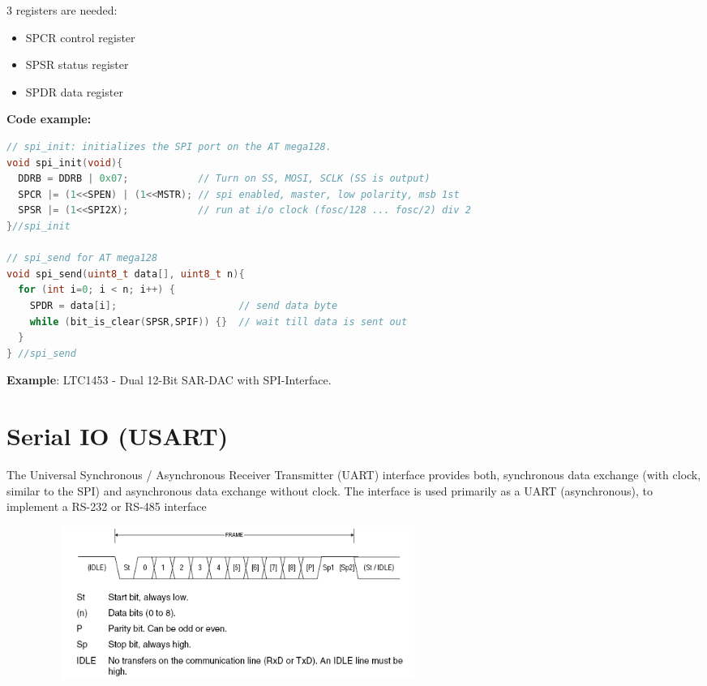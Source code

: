 3 registers are needed:

\begin{multicols}{2}
	\begin{itemize}
	\item  SPCR  control register
	\item  SPSR  status register
	\end{itemize}
	\vfill\null
	\columnbreak
	\begin{itemize}
		\item  SPDR  data register
	\end{itemize}
\end{multicols}
\textbf{Code example:}

\begin{lstlisting}[style=mystyle, language=c]
// spi_init: initializes the SPI port on the AT mega128. 
void spi_init(void){
  DDRB = DDRB | 0x07;            // Turn on SS, MOSI, SCLK (SS is output)
  SPCR |= (1<<SPEN) | (1<<MSTR); // spi enabled, master, low polarity, msb 1st
  SPSR |= (1<<SPI2X);            // run at i/o clock (fosc/128 ... fosc/2) div 2
}//spi_init

// spi_send for AT mega128 
void spi_send(uint8_t data[], uint8_t n){
  for (int i=0; i < n; i++) {
    SPDR = data[i];                     // send data byte
    while (bit_is_clear(SPSR,SPIF)) {}  // wait till data is sent out
  }
} //spi_send
\end{lstlisting}

\textbf{Example}: LTC1453 - Dual 12-Bit SAR-DAC with SPI-Interface.

\section{Serial IO (USART)}

The Universal Synchronous / Asynchronous Receiver Transmitter (UART) interface provides both, synchronous data exchange (with clock, similar to the SPI) and asynchronous data exchange without clock. The interface is used primarily as a UART (asynchronous), to implement a RS-232 or RS-485 interface

    \begin{figure}[h]
    \centering
    \includegraphics[width=13cm, height=5cm]{Images/image45.png}
    \label{fig:Fig 142}
    \end{figure}
 
